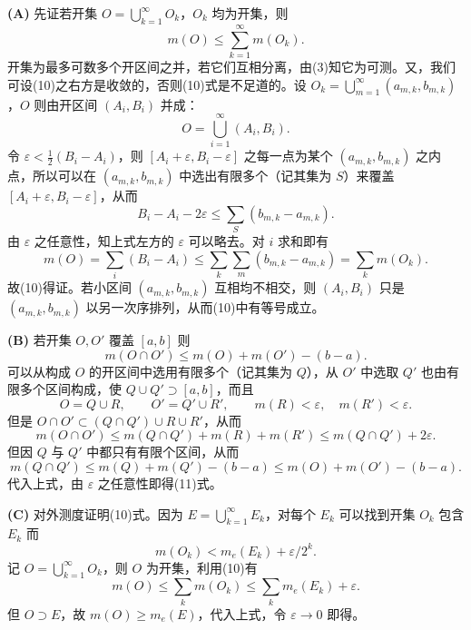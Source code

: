 \noindent\textbf{(A)} 先证若开集 $O=\bigcup_{k=1}^{\infty}O_k$，$O_k$ 均为开集，则
\begin{equation}
 m(O)\le\sum_{k=1}^{\infty}m(O_k).
 \tag{10}
\end{equation}
开集为最多可数多个开区间之并，若它们互相分离，由(3)知它为可测。又，我们可设(10)之右方是收敛的，否则(10)式是不足道的。设 $O_k=\bigcup_{m=1}^{\infty}(a_{m,k},b_{m,k})$，$O$ 则由开区间 $(A_i,B_i)$ 并成：
\[
 O=\bigcup_{i=1}^{\infty}(A_i,B_i).
\]
令 $\varepsilon<\frac12(B_i-A_i)$，则 $[A_i+\varepsilon,B_i-\varepsilon]$ 之每一点为某个 $(a_{m,k},b_{m,k})$ 之内点，所以可以在 $(a_{m,k},b_{m,k})$ 中选出有限多个（记其集为 $S$）来覆盖 $[A_i+\varepsilon,B_i-\varepsilon]$，从而
\[
 B_i-A_i-2\varepsilon\le\sum_S(b_{m,k}-a_{m,k}).
\]
由 $\varepsilon$ 之任意性，知上式左方的 $\varepsilon$ 可以略去。对 $i$ 求和即有
\[
 m(O)=\sum_i(B_i-A_i)\le\sum_k\sum_m(b_{m,k}-a_{m,k})=\sum_km(O_k).
\]
故(10)得证。若小区间 $(a_{m,k},b_{m,k})$ 互相均不相交，则 $(A_i,B_i)$ 只是 $(a_{m,k},b_{m,k})$ 以另一次序排列，从而(10)中有等号成立。

\noindent\textbf{(B)} 若开集 $O,O'$ 覆盖 $[a,b]$ 则
\begin{equation}
 m(O\cap O')\le m(O)+m(O')-(b-a).
 \tag{11}
\end{equation}
可以从构成 $O$ 的开区间中选用有限多个（记其集为 $Q$），从 $O'$ 中选取 $Q'$ 也由有限多个区间构成，使 $Q\cup Q'\supset[a,b]$，而且
\[
 O=Q\cup R,\qquad O'=Q'\cup R',\qquad m(R)<\varepsilon,\quad m(R')<\varepsilon.
\]
但是 $O\cap O'\subset(Q\cap Q')\cup R\cup R'$，从而
\[
 m(O\cap O')\le m(Q\cap Q')+m(R)+m(R')\le m(Q\cap Q')+2\varepsilon.
\]
但因 $Q$ 与 $Q'$ 中都只有有限个区间，从而
\[
 m(Q\cap Q')\le m(Q)+m(Q')-(b-a)\le m(O)+m(O')-(b-a).
\]
代入上式，由 $\varepsilon$ 之任意性即得(11)式。

\noindent\textbf{(C)} 对外测度证明(10)式。因为 $E=\bigcup_{k=1}^{\infty}E_k$，对每个 $E_k$ 可以找到开集 $O_k$ 包含 $E_k$ 而
\[
 m(O_k)<m_e(E_k)+\varepsilon/2^k.
\]
记 $O=\bigcup_{k=1}^{\infty}O_k$，则 $O$ 为开集，利用(10)有
\[
 m(O)\le\sum_km(O_k)\le\sum_km_e(E_k)+\varepsilon.
\]
但 $O\supset E$，故 $m(O)\ge m_e(E)$，代入上式，令 $\varepsilon\to0$ 即得。

